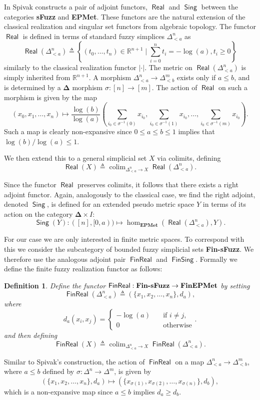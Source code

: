 \documentclass[12pt]{article}
\newtheorem{defn}{Definition}
\DeclareMathOperator{\Real}{\mathsf{Real}}
\DeclareMathOperator{\Sing}{\mathsf{Sing}}
\DeclareMathOperator{\FinReal}{\mathsf{FinReal}}
\DeclareMathOperator{\FinSing}{\mathsf{FinSing}}
\DeclareMathOperator*{\colim}{colim}
\begin{document}
In \cite{spivakmetric} Spivak constructs a pair of adjoint functors, $\Real$ and $\Sing$ between the categories \textbf{sFuzz} and \textbf{EPMet}. These functors are the natural extension of the classical realization and singular set functors from algebraic topology. The functor $\Real$ is defined in terms of standard fuzzy simplices $\Delta^n_{<a}$ as
\[
\Real(\Delta^n_{<a}) \triangleq \left\{ (t_0, \ldots, t_n)\in \mathbb{R}^{n+1}\mid \sum_{i=0}^n t_i = -\log(a), t_i \geq 0 \right\}
\]
similarly to the classical realization functor $|\cdot|$. The metric on $\Real(\Delta^n_{<a})$ is simply inherited from $\mathbb{R}^{n+1}$. A morphism $\Delta^n_{<a}\to \Delta^m_{<b}$ exists only if $a\leq b$, and is determined by a $\boldsymbol{\Delta}$ morphism  $\sigma:[n]\to [m]$. The action of $\Real$ on such a morphism is given by the map
\[
(x_0,x_1,\ldots,x_n) \mapsto \frac{\log(b)}{\log(a)}\left(\sum_{i_0\in\sigma^{-1}(0)} x_{i_0}, \sum_{i_0\in\sigma^{-1}(1)} x_{i_0}, \ldots, \sum_{i_0\in\sigma^{-1}(m)} x_{i_0}\right).
\]
Such a map is clearly non-expansive since $0\leq a \leq b \leq 1$ implies that $\log(b)/\log(a) \leq 1$.

We then extend this to a general simplicial set $X$ via colimits, defining
\[
\Real(X) \triangleq \colim_{\Delta^n_{<a}\to X} \Real(\Delta^n_{<a}).
\]

Since the functor $\Real$ preserves colimits, it follows that there exists a right adjoint functor. Again, analogously to the classical case, we find the right adjoint, denoted $\Sing$, is defined for an extended pseudo metric space $Y$ in terms of its action on the category $\boldsymbol\Delta \times I$:
\[
\Sing(Y):([n], [0,a)) \mapsto \hom_{\textbf{EPMet}}(\Real(\Delta^n_{<a}), Y).
\]

For our case we are only interested in finite metric spaces. To correspond with this we consider the subcategory of bounded fuzzy simplicial sets \textbf{Fin-sFuzz}. We therefore use the analogous adjoint pair $\FinReal$ and $\FinSing$. Formally we define the finite fuzzy realization functor as follows:

\begin{defn}\label{defn:fin-real-func}
Define the functor $\FinReal:\text{\rm \bf Fin-sFuzz}\to\mathbf{FinEPMet}$ by setting
\[
\FinReal(\Delta^n_{<a}) \triangleq (\{x_1, x_2, \ldots, x_n\}, d_a),
\]
where
\[
d_a(x_i, x_j) = \begin{cases}
    -\log(a) & \quad\text{if } i \neq j,\\[4pt]
    0 & \quad\text{otherwise}
\end{cases}.
\]
and then defining
\[
\FinReal(X) \triangleq \colim_{\Delta^n_{<a}\to X} \FinReal(\Delta^n_{<a}).
\]
\end{defn}
Similar to Spivak's construction, the action of $\FinReal$ on a map $\Delta^n_{<a}\to \Delta^m_{<b}$, where $a\leq b$ defined by $\sigma:\Delta^n\to\Delta^m$, is given by
\[
(\{x_1, x_2, \ldots, x_n\}, d_a)\mapsto (\{x_{\sigma(1)}, x_{\sigma(2)}, \ldots, x_{\sigma(n)}\}, d_b),
\] 
which is a non-expansive map since $a \leq b$ implies $d_a \geq d_b$.
\end{document}
